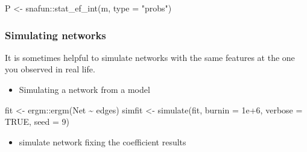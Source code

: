 \documentclass[
]{article}
\newenvironment{Shaded}{\begin{snugshade}}{\end{snugshade}}
\newcommand{\AttributeTok}[1]{\textcolor[rgb]{0.77,0.63,0.00}{#1}}
\newcommand{\ConstantTok}[1]{\textcolor[rgb]{0.00,0.00,0.00}{#1}}
\newcommand{\DecValTok}[1]{\textcolor[rgb]{0.00,0.00,0.81}{#1}}
\newcommand{\FloatTok}[1]{\textcolor[rgb]{0.00,0.00,0.81}{#1}}
\newcommand{\FunctionTok}[1]{\textcolor[rgb]{0.00,0.00,0.00}{#1}}
\newcommand{\NormalTok}[1]{#1}
\newcommand{\OtherTok}[1]{\textcolor[rgb]{0.56,0.35,0.01}{#1}}
\newcommand{\SpecialCharTok}[1]{\textcolor[rgb]{0.00,0.00,0.00}{#1}}
\newcommand{\StringTok}[1]{\textcolor[rgb]{0.31,0.60,0.02}{#1}}
\providecommand{\tightlist}{%
  \setlength{\itemsep}{0pt}\setlength{\parskip}{0pt}}
\begin{document}
\begin{Shaded}
\begin{Highlighting}[]

\NormalTok{P }\OtherTok{\textless{}{-}}\NormalTok{ snafun}\SpecialCharTok{::}\FunctionTok{stat\_ef\_int}\NormalTok{(m, }\AttributeTok{type =} \StringTok{"probs"}\NormalTok{)}
\end{Highlighting}
\end{Shaded}

\hypertarget{simulating-networks}{%
\subsubsection{Simulating networks}\label{simulating-networks}}

It is sometimes helpful to simulate networks with the same features at
the one you observed in real life.

\begin{itemize}
\tightlist
\item
  Simulating a network from a model
\end{itemize}

\begin{Shaded}
\begin{Highlighting}[]
\NormalTok{fit }\OtherTok{\textless{}{-}}\NormalTok{ ergm}\SpecialCharTok{::}\FunctionTok{ergm}\NormalTok{(Net }\SpecialCharTok{\textasciitilde{}}\NormalTok{ edges)}
\NormalTok{simfit }\OtherTok{\textless{}{-}} \FunctionTok{simulate}\NormalTok{(fit, }\AttributeTok{burnin =} \FloatTok{1e+6}\NormalTok{, }\AttributeTok{verbose =} \ConstantTok{TRUE}\NormalTok{, }\AttributeTok{seed =} \DecValTok{9}\NormalTok{)}
\end{Highlighting}
\end{Shaded}

\begin{itemize}
\tightlist
\item
  simulate network fixing the coefficient results
\end{itemize}
\end{document}
